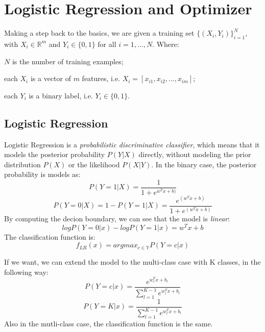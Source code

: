 \chapter{Logistic Regression and Optimizer}
Making a step back to the basics, we are given a training set $\{(X_i, Y_i)\}_{i=1}^N$, with $X_i \in \mathbb{R}^m$ and $Y_i \in \{0,1\}$ for all $i = 1, \dots, N$. Where:
\begin{compactitemize}
    \item $N$ is the number of training examples;
    \item each $X_i$ is a vector of $m$ features, i.e. $X_i = [x_{i1}, x_{i2}, \dots, x_{im}]$;
    \item each $Y_i$ is a binary label, i.e. $Y_i \in \{0,1\}$.
\end{compactitemize}

\section{Logistic Regression}
Logistic Regression is a \emph{probabilistic discriminative classifier}, which means that it models the posterior probability $P(Y|X)$ directly, without modeling the prior distribution $P(X)$ or the likelihood $P(X|Y)$. 
In the binary case, the posterior probability is models as:
\begin{equation}
    P(Y=1|X) = \frac{1}{1 + e^{w^Tx + b)}}
\end{equation}
\begin{equation}
    P(Y=0|X) = 1 - P(Y=1|X) = \frac{e^{(w^Tx + b)}}{1 + e^{(w^Tx + b)}}
\end{equation}
By computing the decion boundary, we can see that the model is \emph{linear}:
\begin{equation}
    log P(Y=0|x)-log P(Y=1|x) = w^T x + b 
\end{equation}
The classification function is:
\begin{equation}
    f_{LR}(x)=argmax_{c \in \mathbb{Y}} P(Y=c|x) 
\end{equation}

If we want, we can extend the model to the multi-class case with K classes, in the following way:
\begin{equation}
    P(Y=c|x)=\frac{e^{w_c^T x + b_c}}{\sum_{l=1}^{K-1} e^{w_l^T x + b_l}}
\end{equation}
\begin{equation}
    P(Y=K|x)=\frac{1}{\sum_{l=1}^{K-1} e^{w_l^T x + b_l}}
\end{equation}
Also in the mutli-class case, the classification function is the same.

